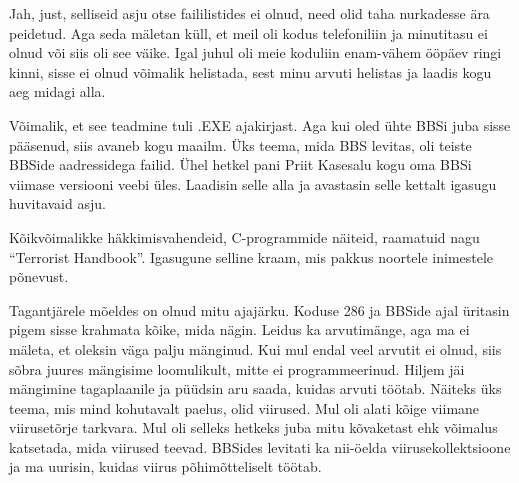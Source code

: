 
Jah, just, selliseid asju otse faililistides ei olnud, need olid taha 
nurkadesse ära peidetud. Aga seda mäletan küll, et meil oli kodus 
telefoniliin ja minutitasu ei olnud või siis 
oli see väike. Igal juhul oli meie koduliin enam-vähem
ööpäev ringi kinni, sisse ei olnud võimalik helistada, sest minu 
arvuti helistas ja laadis kogu aeg midagi alla.


Võimalik, et see teadmine tuli .EXE ajakirjast. Aga kui oled ühte BBSi juba sisse pääsenud, siis avaneb kogu 
maailm. Üks teema, mida BBS levitas, oli teiste BBSide 
aadressidega failid. Ühel hetkel pani Priit Kasesalu 
kogu oma BBSi viimase versiooni veebi üles. Laadisin selle alla ja 
avastasin selle kettalt igasugu huvitavaid asju. 


Kõikvõimalikke häkkimisvahendeid, C-programmide näiteid, raamatuid 
nagu \enquote{Terrorist Handbook}. Igasugune 
selline kraam, mis pakkus noortele inimestele põnevust.


Tagantjärele mõeldes on olnud mitu ajajärku. Koduse 286 ja \mbox{BBSide} ajal üritasin pigem 
sisse krahmata kõike, mida nägin. Leidus ka 
arvutimänge, aga ma ei mäleta, et oleksin väga palju mänginud. 
Kui mul endal veel arvutit ei olnud, siis sõbra juures mängisime loomulikult, 
mitte ei programmeerinud. Hiljem jäi mängimine tagaplaanile ja püüdsin
aru saada, kuidas arvuti töötab. Näiteks üks teema, mis mind 
kohutavalt paelus, olid viirused. Mul oli alati kõige viimane viirusetõrje 
tarkvara. Mul oli selleks hetkeks juba mitu kõvaketast ehk 
võimalus katsetada, mida viirused teevad. BBSides levitati ka nii-öelda 
viirusekollektsioone ja ma uurisin, kuidas viirus 
põhimõtteliselt töötab. 

